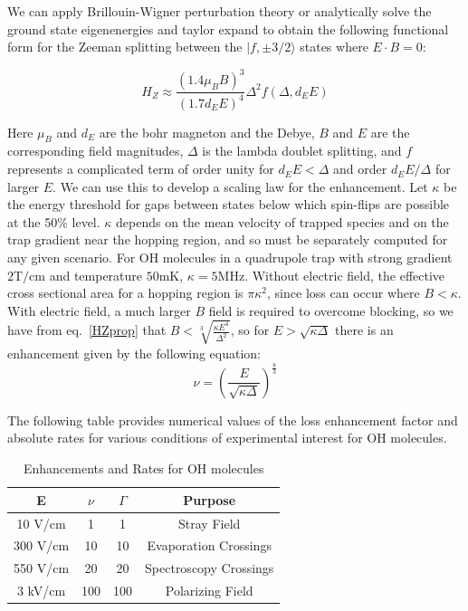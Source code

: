 \documentclass[%
 reprint,
 amsmath,amssymb,
 aps,
prl,
]{revtex4-1}
\begin{document}
We can apply Brillouin-Wigner perturbation theory or analytically solve the ground state eigenenergies and taylor expand to obtain the following functional form for the Zeeman splitting between the $|f,\pm3/2\rangle$ states where $E\cdot B=0$:

\begin{equation}
\label{eq:HZprop}
H_Z\approx \frac{(1.4\mu_BB)^3}{(1.7d_EE)^4}\Delta^2 f(\Delta,d_EE)
\end{equation}

\noindent Here $\mu_B$ and $d_E$ are the bohr magneton and the Debye, $B$ and $E$ are the corresponding field magnitudes, $\Delta$ is the lambda doublet splitting, and $f$ represents a complicated term of order unity for $d_EE < \Delta$ and order $d_EE/\Delta$ for larger $E$. We can use this to develop a scaling law for the enhancement. Let $\kappa$ be the energy threshold for gaps between states below which spin-flips are possible at the 50\% level. $\kappa$ depends on the mean velocity of trapped species and on the trap gradient near the hopping region, and so must be separately computed for any given scenario. For OH molecules in a  quadrupole trap \cite{sawyer2008} with strong gradient $2 \text{T/cm}$ and temperature $50 \text{mK}$, $\kappa=5\text{MHz}$. Without electric field, the effective cross sectional area for a hopping region is $\pi \kappa^2$, since loss can occur where $B<\kappa$. With electric field, a much larger $B$ field is required to overcome blocking, so we have from eq.~\ref{HZprop} that $B < \sqrt[3]{\frac{\kappa E^4}{\Delta^2}}$, so for $E>\sqrt{\kappa\Delta}$ there is an enhancement given by the following equation:
\begin{equation}
\nu = \left(\frac{E}{\sqrt{\kappa\Delta}}\right)^\frac{8}{3}
\label{eq:blimit}
\end{equation} 

The following table provides numerical values of the loss enhancement factor and absolute rates for various conditions of experimental interest for OH molecules.

\begin{table}[h]
\caption{Enhancements and Rates for OH molecules}
\label{tab:rates}
\begin{tabular}{c|ccc}
\toprule
E & $\nu$ & $\Gamma$ & Purpose \\
\toprule
10 V/cm & 1 & 1 & Stray Field \\
300 V/cm & 10 & 10 & Evaporation Crossings\\
550 V/cm & 20 & 20 & Spectroscopy Crossings\\
3 kV/cm & 100 & 100 & Polarizing Field\\
\toprule
\end{tabular}
\end{table}
\end{document}
